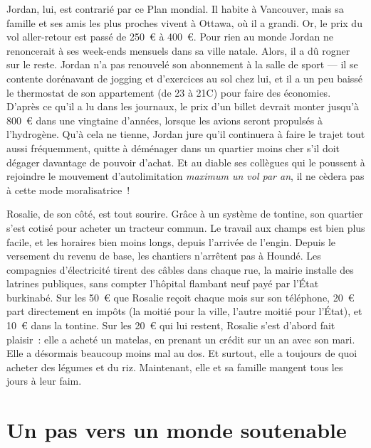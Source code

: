 \documentclass[a5paper,french,openany]{memoir}
\begin{document}
Jordan, lui, est contrarié par ce Plan mondial. Il habite à Vancouver, mais sa famille et ses amis les plus proches vivent à Ottawa, où il a grandi. Or, le prix du vol aller-retour est passé de 250~\euro{} à 400~\euro{}. Pour rien au monde Jordan ne renoncerait à ses week-ends mensuels dans sa ville natale. Alors, il a dû rogner sur le reste. Jordan n'a pas renouvelé son abonnement à la salle de sport --- il se contente dorénavant de jogging et d'exercices au sol chez lui, et il a un peu baissé le thermostat de son appartement (de 23 à 21\textdegree{}C) pour faire des économies. D'après ce qu'il a lu dans les journaux, le prix d'un billet devrait monter jusqu'à 800~\euro{} dans une vingtaine d'années, lorsque les avions seront propulsés à l'hydrogène. Qu'à cela ne tienne, Jordan jure qu'il continuera à faire le trajet tout aussi fréquemment, quitte à déménager dans un quartier moins cher s'il doit dégager davantage de pouvoir d'achat. Et au diable ses collègues qui le poussent à rejoindre le mouvement d'autolimitation \textit{maximum un vol par an}, il ne cèdera pas à cette mode moralisatrice~!

Rosalie, de son côté, est tout sourire. Grâce à un système de tontine, son quartier s'est cotisé pour acheter un tracteur commun. Le travail aux champs est bien plus facile, et les horaires bien moins longs, depuis l'arrivée de l'engin. Depuis le versement du revenu de base, les chantiers n'arrêtent pas à Houndé. Les compagnies d'électricité tirent des câbles dans chaque rue, la mairie installe des latrines publiques, sans compter l'hôpital flambant neuf payé par l'État burkinabé. Sur les 50~\euro{} que Rosalie reçoit chaque mois sur son téléphone, 20~\euro{} part directement en impôts (la moitié pour la ville, l'autre moitié pour l'État), et 10~\euro{} %
dans la tontine. Sur les 20~\euro{} qui lui restent, Rosalie s'est d'abord fait plaisir~: elle a acheté un matelas, en prenant un crédit sur un an avec son mari. Elle a désormais beaucoup moins mal au dos. Et surtout, elle a toujours de quoi acheter des légumes et du riz. Maintenant, elle et sa famille mangent tous les jours à leur faim.


\chapter{Un pas vers un monde soutenable\label{ch:premier_pas}} %
\end{document}

